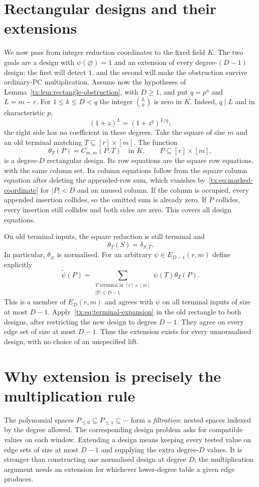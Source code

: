 \documentclass[11pt,a4paper,oneside,openany]{book}
\theoremstyle{definition}\newtheorem{definition}[theorem]{Definition}
\theoremstyle{remark}\newtheorem{remark}[theorem]{Remark}
\numberwithin{equation}{chapter}
\begin{document}
\section{Rectangular designs and their extensions}

We now pass from integer reduction coordinates to the fixed field $K$.
The two goals are a design with $\psi(\varnothing)=1$ and an extension
of every degree-$(D-1)$ design; the first will detect $1$, and the second
will make the obstruction survive ordinary-PC multiplication.
Assume now the hypotheses of Lemma~\ref{tx:lem:rectangle-obstruction}, with
$D\geq1$, and put $q=p^a$ and $L=m-r$.  For $1\leq k\leq D<q$ the
integer $\binom{L}{k}$ is zero in $K$.  Indeed, $q\mid L$ and in
characteristic $p$,
\[
 (1+z)^L=(1+z^q)^{L/q};
\]
the right side has no coefficient in these degrees.  Take the square
of size $m$ and an old terminal matching $T\subseteq[r]\times[m]$.
The function
\[
 \theta_T(P)=C_{m,m}(P,T)\quad\text{in }K,
       \qquad P\subseteq[r]\times[m],
\]
is a degree-$D$ rectangular design.  Its row equations are the square
row equations, with the same column set.  Its column equations follow
from the square column equation after deleting the appended-row sum,
which vanishes by~\eqref{tx:eq:marked-coordinate} for $|P|<D$ and an
unused column.  If the column is occupied, every appended insertion
collides, so the omitted sum is already zero.  If $P$ collides, every
insertion still collides and both sides are zero.  This covers all
design equations.

On old terminal inputs, the square reduction is still terminal and
\[
 \theta_T(S)=\delta_{S,T}.
\]
In particular, $\theta_{\varnothing}$ is normalised.  For an arbitrary
$\psi\in E_{D-1}(r,m)$ define explicitly
\[
 \widetilde\psi(P)=
    \sum_{\substack{T\text{ terminal in }[r]\times[m]\\|T|\leq D-1}}
                     \psi(T)\theta_T(P).
\]
This is a member of $E_D(r,m)$ and agrees with $\psi$ on all terminal
inputs of size at most $D-1$.  Apply~\eqref{tx:eq:terminal-expansion} in the
old rectangle to both designs, after restricting the new design to
degree $D-1$.  They agree on every edge set of size at most $D-1$.
Thus the extension exists for every unnormalised design, with no
choice of an unspecified lift.

\section{Why extension is precisely the multiplication rule}
The polynomial spaces $P_{\le0}\subseteq P_{\le1}\subseteq\cdots$
form a \emph{filtration}: nested spaces indexed by the degree allowed.
The corresponding design problem asks for compatible values on each
window. Extending a design means keeping every tested value on edge
sets of size at most $D-1$ and supplying the extra degree-$D$ values.
It is stronger than constructing one normalised design at degree $D$;
the multiplication argument needs an extension for whichever
lower-degree table a given edge produces.
\end{document}
